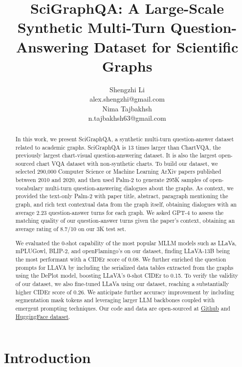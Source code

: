 \documentclass{article}
\title{SciGraphQA: A Large-Scale Synthetic Multi-Turn Question-Answering Dataset for Scientific Graphs}
\author{
    Shengzhi Li \\
    alex.shengzhi@gmail.com \\
   \And
    Nima Tajbakhsh \\
    n.tajbakhsh63@gmail.com \\
}
\begin{document}
\maketitle

\begin{abstract}


In this work, we present SciGraphQA, a synthetic multi-turn question-answer dataset related to academic graphs. SciGraphQA is 13
times larger than ChartVQA, the previously largest chart-visual question-answering dataset. It is also
the largest open-sourced chart VQA dataset with non-synthetic charts. To build our dataset, we selected 290,000 Computer Science or Machine Learning ArXiv papers published between 2010 and 2020, and then used Palm-2 to generate 295K samples of open-vocabulary multi-turn question-answering dialogues about the graphs. As context, we provided the text-only Palm-2 with paper title, abstract, paragraph mentioning the graph, and rich text contextual data from the graph itself, obtaining dialogues with an average 2.23 question-answer turns for each graph. We asked GPT-4 to assess the matching quality of our question-answer turns given the paper's context, obtaining an average rating of 8.7/10 on our 3K test set. 

We evaluated the 0-shot capability of the most popular MLLM models such as LLaVa, mPLUGowl, BLIP-2, and openFlamingo's on our dataset, finding LLaVA-13B being the most performant with a CIDEr score of 0.08. We further enriched the question prompts for LLAVA by including the serialized data tables extracted from the graphs using the DePlot model, boosting LLaVA's 0-shot CIDEr to 0.15. To verify the validity of our dataset, we also fine-tuned LLaVa using our dataset, reaching a substantially higher CIDEr score of 0.26. We anticipate further accuracy improvement by including segmentation mask tokens and leveraging larger LLM backbones coupled with emergent prompting techniques. Our code and data are open-sourced at \hyperlink{https://github.com/findalexli/SciGraphQA}{Github} and \hyperlink{https://huggingface.co/datasets/alexshengzhili/SciGraphQA-295K-train}{HuggingFace dataset}.





\end{abstract}




\section{Introduction}
\end{document}

